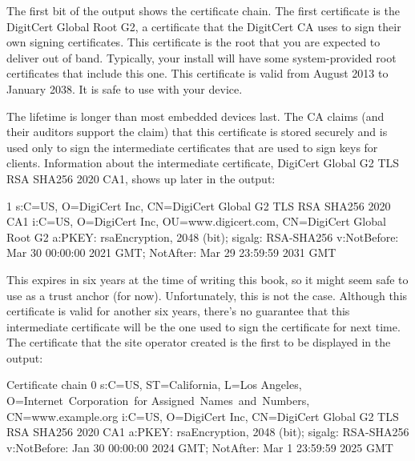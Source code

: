 
The first bit of the output shows the certificate chain.
The first certificate is the DigitCert Global Root G2, a certificate that the DigitCert CA uses to sign their own signing certificates.
This certificate is the root that you are expected to deliver out of band.
Typically, your  install will have some system-provided root certificates that include this one.
This certificate is valid from August 2013 to January 2038.
It is  safe to use with your device.

The lifetime is longer than most embedded devices last.
The CA claims (and their auditors support the claim) that this certificate is stored securely and is used only to sign the intermediate certificates that are used to sign keys for clients.
Information about the intermediate certificate, DigiCert Global G2 TLS RSA SHA256 2020 CA1, shows up later in the output:

\begin{console}
 1 s:C=US, O=DigiCert Inc, CN=DigiCert Global G2 TLS RSA SHA256 2020 CA1
   i:C=US, O=DigiCert Inc, OU=www.digicert.com, CN=DigiCert Global Root G2
   a:PKEY: rsaEncryption, 2048 (bit); sigalg: RSA-SHA256
   v:NotBefore: Mar 30 00:00:00 2021 GMT; NotAfter: Mar 29 23:59:59 2031 GMT
\end{console}

This expires in six years at the time of writing this book, so it might seem safe to use as a trust anchor (for now).
Unfortunately, this is not the case.
Although this certificate is valid for another six years, there's no guarantee that this intermediate certificate will be the one used to sign the certificate for  next time.
The certificate that the site operator created is the first to be displayed in the output:

\begin{console}
Certificate chain
 0 s:C=US, ST=California, L=Los Angeles, O=Internet Corporation for
        Assigned Names and Numbers, CN=www.example.org
   i:C=US, O=DigiCert Inc, CN=DigiCert Global G2 TLS RSA SHA256 2020 CA1
   a:PKEY: rsaEncryption, 2048 (bit); sigalg: RSA-SHA256
   v:NotBefore: Jan 30 00:00:00 2024 GMT; NotAfter: Mar  1 23:59:59 2025 GMT
\end{console}

